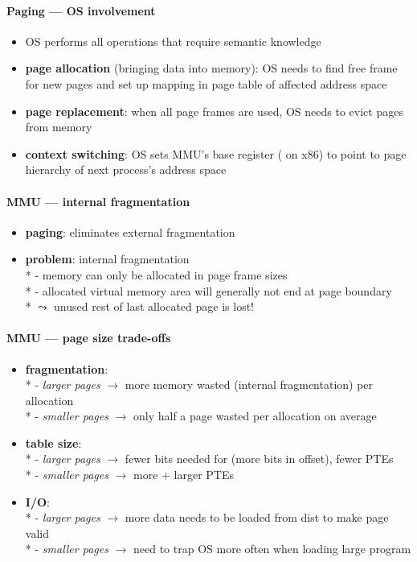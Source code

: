 \paragraph{Paging --- OS involvement}
\begin{itemize}
  \item OS performs all operations that require semantic knowledge
  \item \textbf{page allocation} (bringing data into memory): OS needs to find free frame for new pages and set up mapping in page table of affected address space
  \item \textbf{page replacement}: when all page frames are used, OS needs to evict pages from memory
  \item \textbf{context switching}: OS sets MMU's base register ( on x86) to point to page hierarchy of next process's address space
\end{itemize}

\paragraph{MMU --- internal fragmentation}
\begin{itemize}
  \item \textbf{paging}: eliminates external fragmentation
  \item \textbf{problem}: internal fragmentation \\*
    - memory can only be allocated in page frame sizes \\*
    - allocated virtual memory area will generally not end at page boundary \\*
    \( \leadsto \) unused rest of last allocated page is lost!
\end{itemize}

\paragraph{MMU --- page size trade-offs}
\begin{itemize}
  \item \textbf{fragmentation}: \\*
    - \emph{larger pages} \( \to \) more memory wasted (internal fragmentation) per allocation \\*
    - \emph{smaller pages} \( \to \) only half a page wasted per allocation on average
  \item \textbf{table size}: \\*
    - \emph{larger pages} \( \to \) fewer bits needed for  (more bits in offset), fewer PTEs \\*
    - \emph{smaller pages} $ \to $ more + larger PTEs
  \item \textbf{I/O}: \\*
    - \emph{larger pages} $ \to $ more data needs to be loaded from dist to make page valid \\*
    - \emph{smaller pages} $ \to $ need to trap OS more often when loading large program
\end{itemize}

